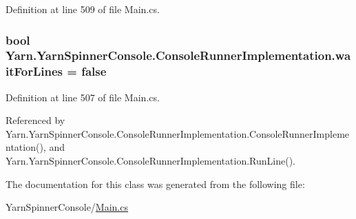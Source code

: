 Definition at line 509 of file Main.\-cs.

\hypertarget{a00055_a90b0c755ea1d2f3ffaffa6cf18266709}{
\subsubsection[{wait\-For\-Lines}]{\setlength{\rightskip}{0pt plus 5cm}bool Yarn.\-Yarn\-Spinner\-Console.\-Console\-Runner\-Implementation.\-wait\-For\-Lines = false\hspace{0.3cm}{\ttfamily [private]}}}\label{a00055_a90b0c755ea1d2f3ffaffa6cf18266709}


Definition at line 507 of file Main.\-cs.



Referenced by Yarn.\-Yarn\-Spinner\-Console.\-Console\-Runner\-Implementation.\-Console\-Runner\-Implementation(), and Yarn.\-Yarn\-Spinner\-Console.\-Console\-Runner\-Implementation.\-Run\-Line().



The documentation for this class was generated from the following file\-:\begin{DoxyCompactItemize}
\item 
Yarn\-Spinner\-Console/\hyperlink{a00303}{Main.\-cs}\end{DoxyCompactItemize}
